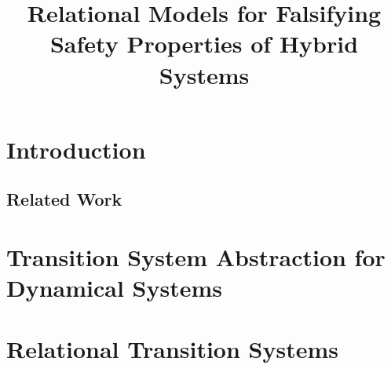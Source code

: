 \documentclass[9pt,sigconf]{acmart}
\begin{document}
\sloppy




\title{Relational Models for Falsifying Safety Properties of Hybrid Systems}






\begin{abstract}

\end{abstract}

\maketitle

\section{Introduction}
\label{sec:intro}



\subsection{Related Work}
\label{sec:rel}


\section{Transition System Abstraction for Dynamical Systems}
\label{sec:scam}


\section{Relational Transition Systems}
\label{sec:scamr}

\end{document}
